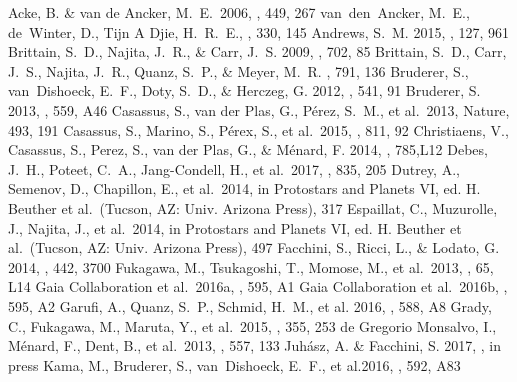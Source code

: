 \documentclass[onecolumn]{aastex6}
\begin{document}
\begin{thebibliography}{}
 Acke, B. \& van de Ancker, M.~E.~2006, \aap, 449, 267
 van~den~Ancker, M.~E., de~Winter, D., Tijn A Djie, H.~R.~E., \aap, 330, 145
 Andrews, S.~M. 2015, \pasp, 127, 961
 Brittain, S.~D., Najita, J.~R., \& Carr, J.~S. 2009, \apj, 702, 85
 Brittain, S.~D., Carr, J.~S., Najita, J.~R., Quanz, S.~P., \& Meyer, M.~R. \apj, 791, 136
 Bruderer, S., van~Dishoeck, E.~F., Doty, S.~D., \& Herczeg, G. 2012, \aap, 541, 91
 Bruderer, S. 2013, \aap, 559, A46
 Casassus, S., van der Plas, G., P\'{e}rez, S.~M., et al.~2013, Nature, 493, 191
 Casassus, S., Marino, S., P\'{e}rex, S., et al.~2015, \apj, 811, 92
 Christiaens, V., Casassus, S., Perez, S., van der Plas, G., \& M\'{e}nard, F. 2014, \apjl, 785,L12
 Debes, J.~H., Poteet, C.~A., Jang-Condell, H., et al.~2017, \apj, 835, 205
 Dutrey, A., Semenov, D., Chapillon, E., et al.~2014, in Protostars and Planets VI, ed. H. Beuther et al.~(Tucson, AZ: Univ. Arizona Press), 317
 Espaillat, C., Muzurolle, J., Najita, J., et al.~2014, in Protostars and Planets VI, ed. H. Beuther et al.~(Tucson, AZ: Univ. Arizona Press), 497
 Facchini, S., Ricci, L., \& Lodato, G. 2014, \mnras, 442, 3700
 Fukagawa, M., Tsukagoshi, T., Momose, M., et al.~2013, \pasj, 65, L14
 Gaia Collaboration et al.~2016a, \aap, 595, A1
 Gaia Collaboration et al.~2016b, \aap, 595, A2
 Garufi, A., Quanz, S.~P., Schmid, H.~M., et al. 2016, \aap, 588, A8
 Grady, C., Fukagawa, M., Maruta, Y., et al.~2015, \apss, 355, 253
 de Gregorio Monsalvo, I., M\'{e}nard, F., Dent, B., et al.~2013, \aap, 557, 133
 Juh\'{a}sz, A. \& Facchini, S. 2017, \mnras, in press
 Kama, M., Bruderer, S., van~Dishoeck, E.~F., et al.2016, \aap, 592, A83

\end{thebibliography}
\end{document}
